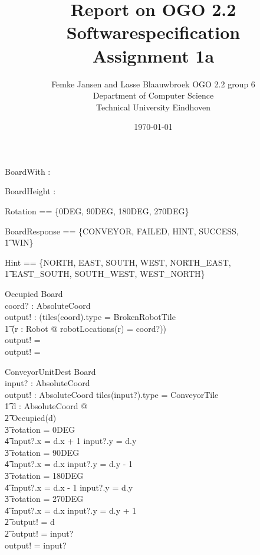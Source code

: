 \documentclass[12pt]{article}
\title{Report on OGO 2.2 Softwarespecification\\ Assignment 1a}
\author{
        Femke Jansen and Lasse Blaauwbroek OGO 2.2 group 6 \\
                Department of Computer Science\\
        Technical University Eindhoven\\
}
\date{\today}
\begin{document}
\maketitle

\begin{abstract}

\end{abstract}

\begin{axdef}
BoardWith : \nat
\end{axdef}

\begin{axdef}
BoardHeight : \nat
\end{axdef}

\begin{axdef}
Rotation == \{0DEG, 90DEG, 180DEG, 270DEG\}
\end{axdef}

\begin{axdef}
BoardResponse == \{CONVEYOR, FAILED, HINT, SUCCESS, \\ \t1 WIN\}
\end{axdef}

\begin{axdef}
Hint == \{NORTH, EAST, SOUTH, WEST, NORTH\_EAST, \\ \t1 EAST\_SOUTH, SOUTH\_WEST, WEST\_NORTH\}
\end{axdef}

\begin{schema}{Occupied}
\Xi Board \\
coord? : AbsoluteCoord \\
output! : \bool
\where
\IF (tiles(coord).type = BrokenRobotTile \vee \\ \t1
(\exists r : Robot @ robotLocations(r) = coord?)) \\
\THEN
output! = \true \\
\ELSE
output! = \false
\end{schema}

\begin{schema}{ConveyorUnitDest}
\Xi Board \\
input? : AbsoluteCoord \\
output! : AbsoluteCoord
\where
\IF tiles(input?).type = ConveyorTile \\ \t1
\exists d : AbsoluteCoord @ \\ \t2
\IF \neg Occupied(d) \\ \t3
rotation = 0DEG \Rightarrow \\ \t4 input?.x = d.x + 1 \wedge input?.y = d.y \\ \t3
rotation = 90DEG \Rightarrow \\ \t4 input?.x = d.x \wedge input?.y = d.y - 1
\\ \t3
rotation = 180DEG \Rightarrow \\ \t4 input?.x = d.x - 1 \wedge input?.y = d.y \\ \t3
rotation = 270DEG \Rightarrow \\ \t4 input?.x = d.x \wedge input?.y = d.y + 1 \\ \t2
\THEN output! = d \\ \t2
\ELSE output! = input? \\ 
\ELSE output! = input?
\end{schema}
\end{document}
